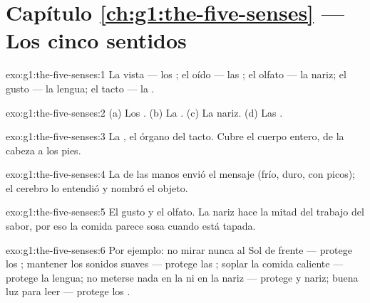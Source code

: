 \section*{Capítulo \ref{ch:g1:the-five-senses} --- Los cinco sentidos}

\begin{solution}{exo:g1:the-five-senses:1}
La vista --- los ; el oído --- las ; el olfato --- la nariz;
el gusto --- la lengua; el tacto --- la .
\end{solution}

\begin{solution}{exo:g1:the-five-senses:2}
(a) Los . (b) La . (c) La nariz. (d) Las .
\end{solution}

\begin{solution}{exo:g1:the-five-senses:3}
La , el órgano del tacto. Cubre el cuerpo entero, de la cabeza a
los pies.
\end{solution}

\begin{solution}{exo:g1:the-five-senses:4}
La  de las manos envió el mensaje (frío, duro, con picos); el
cerebro lo entendió y nombró el objeto.
\end{solution}

\begin{solution}{exo:g1:the-five-senses:5}
El gusto y el olfato. La nariz hace la mitad del trabajo del sabor,
por eso la comida parece sosa cuando está tapada.
\end{solution}

\begin{solution}{exo:g1:the-five-senses:6}
Por ejemplo: no mirar nunca al Sol de frente --- protege los ;
mantener los sonidos suaves --- protege las ; soplar la comida
caliente --- protege la lengua; no meterse nada en la  ni en la
nariz --- protege  y nariz; buena luz para leer --- protege los .
\end{solution}

